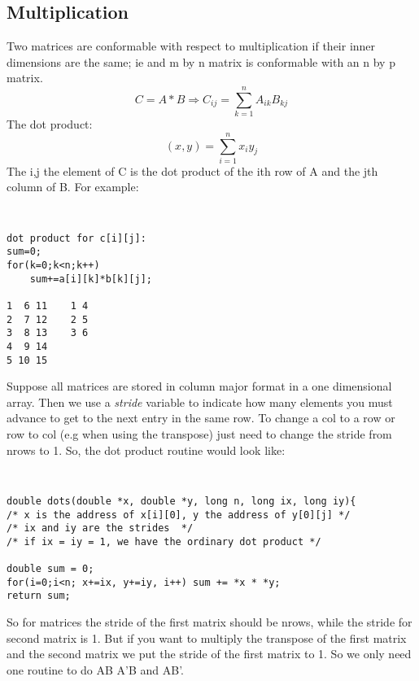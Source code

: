 \documentclass{article}
\begin{document}
\subsection{Multiplication}
Two matrices are conformable with respect to multiplication if their
inner dimensions are the same; ie and m by n matrix is conformable
with an n by p matrix.
\[
C = A * B \Rightarrow C_{ij} = \sum_{k=1}^n A_{ik} B_{kj}
\]
The dot product:
\[ 
(x,y) = \sum_{i=1}^n x_i y_j \]
The i,j the element of C is the dot product of the ith row of A
and the jth column of B.   For example:
{\tt
\begin{verbatim}
dot product for c[i][j]:
sum=0;
for(k=0;k<n;k++) 
    sum+=a[i][k]*b[k][j];

1  6 11    1 4
2  7 12    2 5
3  8 13    3 6
4  9 14
5 10 15
\end{verbatim}}
Suppose all matrices are stored in column major format in a one
dimensional array.  Then we use a \emph{stride} variable to indicate
how many elements you must advance to get to the next 
entry in the same row.  To change a col to a row or row to col (e.g
when using the transpose) just need to change the stride from nrows
to 1.  So, the dot product routine would look like:
{\tt
\begin{verbatim}
double dots(double *x, double *y, long n, long ix, long iy){
/* x is the address of x[i][0], y the address of y[0][j] */
/* ix and iy are the strides  */
/* if ix = iy = 1, we have the ordinary dot product */

double sum = 0;
for(i=0;i<n; x+=ix, y+=iy, i++) sum += *x * *y;
return sum;
\end{verbatim}}
So for matrices the stride of the first matrix should be nrows,
while the stride for second matrix is 1.  But if you want
to multiply the transpose of the first matrix and the second matrix
we put the stride of the first matrix to 1.  So we only need one
routine to do AB A'B and AB'.
\end{document}
